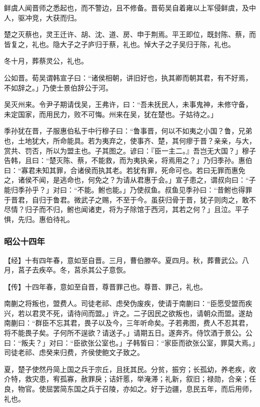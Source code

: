 \documentclass[]{article}
\begin{document}
鲜虞人闻晋师之悉起也，而不警边，且不修备。晋荀吴自着雍以上军侵鲜虞，及中人，驱冲竞，大获而归。

楚之灭蔡也，灵王迁许、胡、沈、道、房、申于荆焉。平王即位，既封陈、蔡，而皆复之，礼也。隐大子之子庐归于蔡，礼也。悼大子之子吴归于陈，礼也。

冬十月，葬蔡灵公，礼也。

公如晋。荀吴谓韩宣子曰：``诸侯相朝，讲旧好也，执其卿而朝其君，有不好焉，不如辞之。」乃使士景伯辞公于河。

吴灭州来。令尹子期请伐吴，王弗许，曰：``吾未抚民人，未事鬼神，未修守备，未定国家，而用民力，败不可悔。州来在吴，犹在楚也。子姑待之。」

季孙犹在晋，子服惠伯私于中行穆子曰：``鲁事晋，何以不如夷之小国？鲁，兄弟也，土地犹大，所命能具。若为夷弃之，使事齐、楚，其何瘳于晋？亲亲，与大，赏共、罚否，所以为盟主也。子其图之。谚曰：『臣一主二。』吾岂无大国？」穆子告韩，且曰：``楚灭陈、蔡，不能救，而为夷执亲，将焉用之？」乃归季孙。惠伯曰：``寡君未知其罪，合诸侯而执其老。若犹有罪，死命可也。若曰无罪而惠免之，诸侯不闻，是逃命也，何免之？为请从君惠于会。」宣子患之，谓叔向曰：``子能归季孙乎？」对曰：``不能。鲋也能。」乃使叔鱼。叔鱼见季孙曰：``昔鲋也得罪于晋君，自归于鲁君。微武子之赐，不至于今。虽获归骨于晋，犹子则肉之，敢不尽情？归子而不归，鲋也闻诸吏，将为子除馆于西河，其若之何？」且泣。平子惧，先归。惠伯待礼。

\hypertarget{header-n2608}{%
\subsubsection{昭公十四年}\label{header-n2608}}

【经】十有四年春，意如至自晋。三月，曹伯滕卒。夏四月。秋，葬曹武公。八月，莒子去疾卒。冬，莒杀其公子意恢。

【传】十四年春，意如至自晋，尊晋罪己也。尊晋、罪己，礼也。

南蒯之将叛也，盟费人。司徒老祁、虑癸伪废疾，使请于南蒯曰：``臣愿受盟而疾兴，若以君灵不死，请待间而盟。」许之。二子因民之欲叛也，请朝众而盟。遂劫南蒯曰：``群臣不忘其君，畏子以及今，三年听命矣。子若弗图，费人不忍其君，将不能畏子矣。子何所不逞欲？请送子。」请期五日。遂奔齐。侍饮酒于景公。公曰：``叛夫？」对曰：``臣欲张公室也。」子韩皙曰：``家臣而欲张公室，罪莫大焉。」司徒老祁、虑癸来归费，齐侯使鲍文子致之。

夏，楚子使然丹简上国之兵于宗丘，且抚其民。分贫，振穷；长孤幼，养老疾，收介特，救灾患，宥孤寡，赦罪戾；诘奸慝，举淹滞；礼新，叙旧；禄勋，合亲；任良，物官。使屈罢简东国之兵于召陵，亦如之。好于边疆，息民五年，而后用师，礼也。
\end{document}
